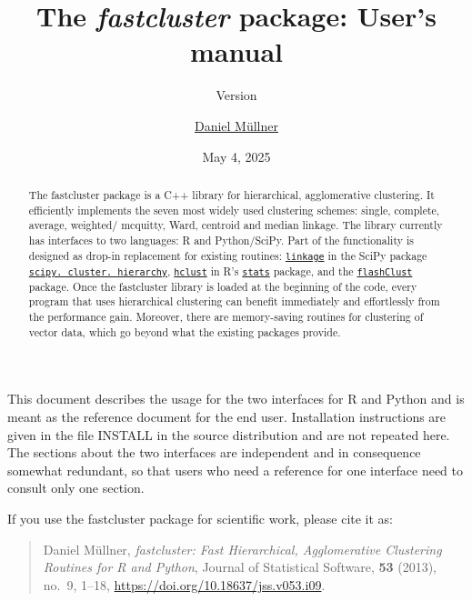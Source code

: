 \documentclass[fontsize=10pt,paper=letter,BCOR=-6mm,DIV=8]{scrartcl}
\newcommand*\linkage{\href{https://docs.scipy.org/doc/scipy/reference/generated/scipy.cluster.hierarchy.linkage.html}{\texttt{linkage}}}
\newcommand*\hierarchy{\href{https://docs.scipy.org/doc/scipy/reference/generated/scipy.cluster.hierarchy.linkage.html}{\texttt{scipy.\hskip0pt cluster.\hskip0pt hierarchy}}}
\newcommand*\hclust{\href{https://stat.ethz.ch/R-manual/R-patched/library/stats/html/hclust.html}{\texttt{hclust}}}
\newcommand*\stats{\href{https://stat.ethz.ch/R-manual/R-patched/library/stats/html/00Index.html}{\texttt{stats}}}
\newcommand*\flashClustPack{\href{https://CRAN.R-project.org/package=flashClust}{\texttt{flashClust}}}
\begin{document}
\title{The \textit{fastcluster} package: User's manual}
\author{\href{https://danifold.net}{Daniel Müllner}}
\date{May 4, 2025}
\subtitle{Version \fastclusterversion}
\maketitle

\makeatletter
\renewenvironment{quotation}{%
  \list{}{\listparindent 1em%
    \itemindent    \listparindent
    \leftmargin2.5em
    \rightmargin   \leftmargin
    \parsep        \z@ \@plus\p@
  }%
  \item\relax
}{%
  \endlist
}
\makeatother
\begin{abstract}\noindent\small
The fastcluster package is a C++ library for hierarchical, agglomerative
clustering. It efficiently implements the
seven most widely used clustering schemes: single, complete, average, weighted/\hskip0pt mcquitty, Ward, centroid and median linkage. The library currently has interfaces to two languages: R and Python/SciPy. Part of the functionality is designed as drop-in replacement for existing routines: \linkage{} in the SciPy package \hierarchy{}, \hclust{} in R's \stats{} package, and the \flashClustPack{} package. Once the fastcluster library is loaded at the beginning of the code, every program that uses hierarchical clustering can benefit immediately and effortlessly from the performance gain. Moreover, there are memory-saving routines for clustering of vector data, which go beyond what the existing packages provide.
\end{abstract}

\noindent
This document describes the usage for the two interfaces for R and Python and is meant as the reference document for the end user. Installation instructions are given in the file INSTALL in the source distribution and are not repeated here. The sections about the two interfaces are independent and in consequence somewhat redundant, so that users who need a reference for one interface need to consult only one section.

If you use the fastcluster package for scientific work, please cite it as:
\begin{quote}
Daniel Müllner, \textit{fastcluster: Fast Hierarchical, Agglomerative Clustering Routines for R and Python}, Journal of Statistical Software, \textbf{53} (2013), no.~9, 1--18, \url{https://doi.org/10.18637/jss.v053.i09}.
\end{quote}
\end{document}

